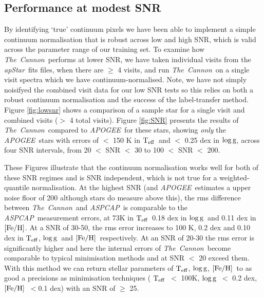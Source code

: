 \documentclass[12pt, preprint]{aastex}
\newcommand{\teff}{\mbox{$\rm T_{eff}$}}
\newcommand{\feh}{\mbox{$\rm [Fe/H]$}}
\newcommand{\logg}{\mbox{$\rm \log g$}}
\newcommand{\tc}{\textsl{The~Cannon}}
\newcommand{\apogee}{\textsl{APOGEE}}
\newcommand{\aspcap}{\textsl{ASPCAP}}
\newcommand{\apstar}{\textsl{apStar}}
\begin{document}
 \subsection{Performance at modest SNR}


By identifying `true' continuum pixels we have been able to implement a simple continuum normalisation that is robust across low and high SNR, which is valid across the parameter range of our training set. To examine how \tc\ performs at lower SNR, we have taken individual visits from the \apstar\ fits files, when there are $\ge$ 4 visits, and run \tc\ on a single visit spectra which we have continuum-normalised. Note, we have not simply noisifyed the combined visit data for our low SNR tests so this relies on both a robust continuum normalisation and the success of the label-transfer method. Figure \ref{fig:lowsnr} shows a comparison of a sample star for a single visit and combined visits ($>$ 4 total visits). Figure \ref{fig:SNR} presents the results of \tc\ compared to \apogee\ for these stars, showing \textit{only} the \apogee\ stars with errors of $<$ 150 K in \teff\ and $<$ 0.25 dex in \logg, across four SNR intervals, from 20 $<$ SNR $<$ 30 to 100 $<$ SNR $<$ 200. 


These Figures illustrate that the continuum normalisation works well for both of these SNR regimes and is SNR independent, which is not true for a weighted-quantile normalisation. At the highest SNR (and \apogee\ estimates a upper noise floor of 200 although stars do measure above this), the rms difference between \tc\ and \aspcap\ is comparable to the \aspcap\ measurement errors, at 73K in \teff\, 0.18 dex in \logg\ and 0.11 dex in \feh.  At a SNR of 30-50, the rms error increases to 100 K, 0.2 dex and 0.10 dex in \teff, \logg\ and \feh\, respectively. At an SNR of 20-30 the rms error is significantly higher and here the internal errors of \tc\ become comparable to typical minimisation methods and at SNR $<$ 20 exceed them. With this method we can return stellar parameters of \teff, \logg, \feh\ to as good a precisions as minimisation techniques ( \teff\ $<$ 100K, \logg\ $<$ 0.2 dex, \feh\ $< $0.1 dex) with an SNR of $\ge$ 25. 
 
\end{document}
